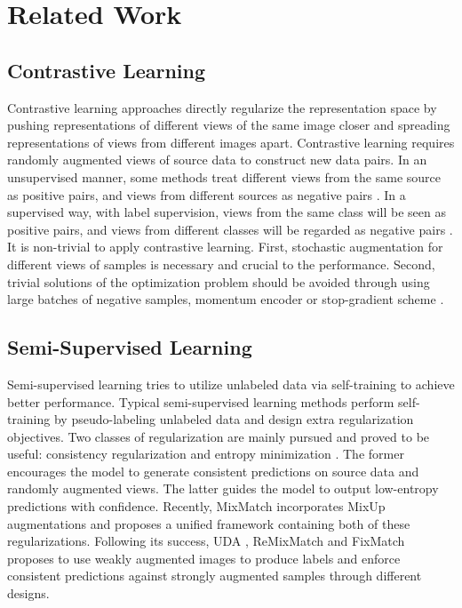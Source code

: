 \documentclass[letterpaper]{article} \usepackage{aaai22}  \usepackage{times}  \usepackage{helvet}  \usepackage{courier}  \usepackage[hyphens]{url}  \usepackage{graphicx} \usepackage{subfigure}
\begin{document}
\section{Related Work}

\subsection{Contrastive Learning}
Contrastive learning approaches directly regularize the representation space by pushing representations of different views of the same image closer and spreading representations of views from different images apart. Contrastive learning requires randomly augmented views of source data to construct new data pairs. In an unsupervised manner, some methods treat different views from the same source as positive pairs, and views from different sources as negative pairs \cite{chen2020simple}. In a supervised way, with label supervision, views from the same class will be seen as positive pairs, and views from different classes will be regarded as negative pairs \cite{khosla2020supervised}. It is non-trivial to apply contrastive learning. First, stochastic augmentation for different views of samples is necessary and crucial to the performance.
Second, trivial solutions of the optimization problem should be avoided through using large batches of negative samples, momentum encoder \cite{he2020momentum, grill2020bootstrap} or stop-gradient scheme \cite{chen2020exploring}. 
\subsection{Semi-Supervised Learning}
Semi-supervised learning tries to utilize unlabeled data via self-training to achieve better performance. Typical semi-supervised learning methods perform self-training by pseudo-labeling unlabeled data and design extra regularization objectives. Two classes of regularization are mainly pursued and proved to be useful: consistency regularization \cite{tarvainen2017mean} and entropy minimization \cite{grandvalet2004semi}. The former encourages the model to generate consistent predictions on source data and randomly augmented views. The latter guides the model to output low-entropy predictions with confidence. Recently, MixMatch \cite{berthelot2019mixmatch} incorporates MixUp augmentations \cite{zhang2017mixup} and proposes a unified framework containing both of these regularizations. Following its success, UDA \cite{xie2020unsupervised}, ReMixMatch \cite{berthelot2019remixmatch} and FixMatch \cite{sohn2020fixmatch} proposes to use weakly augmented images to produce labels and enforce consistent predictions against strongly augmented samples through different designs. 
\end{document}
